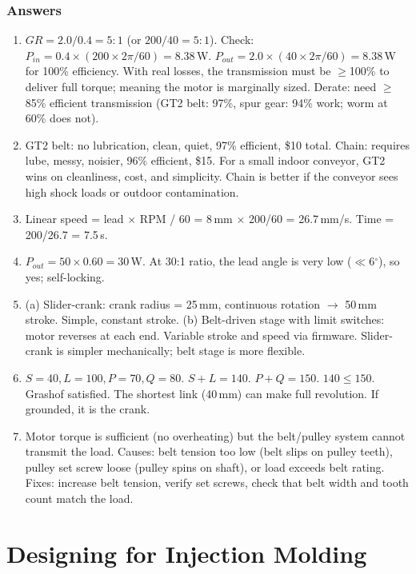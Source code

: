 \documentclass[11pt,letterpaper,twoside,openany]{book}
\providecommand{\ang}[1]{#1\ensuremath{{}^{\circ}}}
\begin{document}
\subsection{Answers}
\begin{enumerate}[leftmargin=1.5em]
\item $GR = 2.0/0.4 = 5:1$ (or $200/40 = 5:1$). Check: $P_{in} = 0.4 \times (200 \times 2\pi/60) = 8.38$\,W. $P_{out} = 2.0 \times (40 \times 2\pi/60) = 8.38$\,W for 100\% efficiency. With real losses, the transmission must be $\geq$100\% to deliver full torque; meaning the motor is marginally sized. Derate: need $\geq$85\% efficient transmission (GT2 belt: 97\%, spur gear: 94\% work; worm at 60\% does not).
\item GT2 belt: no lubrication, clean, quiet, 97\% efficient, \$10 total. Chain: requires lube, messy, noisier, 96\% efficient, \$15. For a small indoor conveyor, GT2 wins on cleanliness, cost, and simplicity. Chain is better if the conveyor sees high shock loads or outdoor contamination.
\item Linear speed = lead $\times$ RPM / 60 = 8\,mm $\times$ 200/60 = 26.7\,mm/s. Time = 200/26.7 = 7.5\,s.
\item $P_{out} = 50 \times 0.60 = 30$\,W. At 30:1 ratio, the lead angle is very low ($\ll$\ang{6}), so yes; self-locking.
\item (a) Slider-crank: crank radius = 25\,mm, continuous rotation $\to$ 50\,mm stroke. Simple, constant stroke. (b) Belt-driven stage with limit switches: motor reverses at each end. Variable stroke and speed via firmware. Slider-crank is simpler mechanically; belt stage is more flexible.
\item $S = 40, L = 100, P = 70, Q = 80$. $S + L = 140$. $P + Q = 150$. $140 \leq 150$. Grashof satisfied. The shortest link (40\,mm) can make full revolution. If grounded, it is the crank.
\item Motor torque is sufficient (no overheating) but the belt/pulley system cannot transmit the load. Causes: belt tension too low (belt slips on pulley teeth), pulley set screw loose (pulley spins on shaft), or load exceeds belt rating. Fixes: increase belt tension, verify set screws, check that belt width and tooth count match the load.
\end{enumerate}

\chapter{Designing for Injection Molding}
\end{document}
